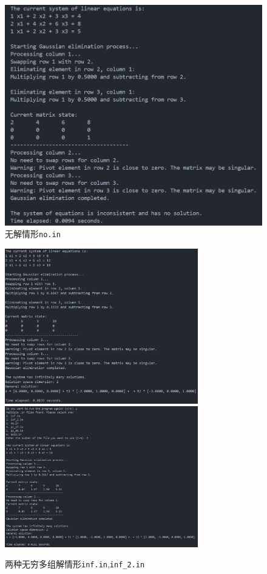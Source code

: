 \begin{figure}[H]
	\centering
	\includegraphics[width=1.0\textwidth]{Problem_2/figs/no.png}
	\caption{无解情形\texttt{no.in}}
\end{figure}

\begin{figure}[H]
	\centering
	\includegraphics[width=0.75\textwidth]{Problem_2/figs/inf.png}
	\includegraphics[width=0.75\textwidth]{Problem_2/figs/inf_2.png}
	\caption{两种无穷多组解情形\texttt{inf.in},\texttt{inf\_2.in}}
\end{figure}

